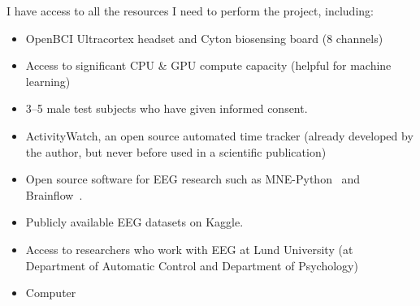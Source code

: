 \documentclass{IEEEtran}
\begin{document}
\begin{refsection}
I have access to all the resources I need to perform the project, including:

\begin{itemize}
  \item OpenBCI Ultracortex headset and Cyton biosensing board (8 channels)
  \item Access to significant CPU \& GPU compute capacity (helpful for machine learning)
  \item 3--5 male test subjects who have given informed consent.
  \item ActivityWatch, an open source automated time tracker (already developed by the author, but never before used in a scientific publication)
  \item Open source software for EEG research such as MNE-Python~\cite{noauthor_mne-toolsmne-python_2020} and Brainflow~\cite{noauthor_brainflow-devbrainflow_2020}.
  \item Publicly available EEG datasets on Kaggle.\cite{noauthor_search_nodate}
  \item Access to researchers who work with EEG at Lund University (at Department of Automatic Control and Department of Psychology)
  \item Computer
\end{itemize}

\printbibliography[category=cited]

\nocite{*}
  {\list{}
     {\setlength{\leftmargin}{\bibhang}%
      \setlength{\itemindent}{-\leftmargin}%
      \setlength{\itemsep}{\bibitemsep}%
      \setlength{\parsep}{\bibparsep}}
  }
  {\endlist}
  {\item}
\printbibliography[notcategory=cited, env=bibnonum, heading=notcited]

\end{refsection}
\end{document}

